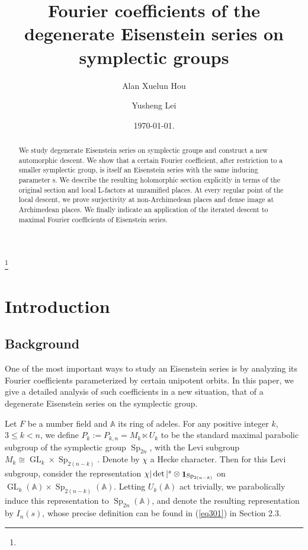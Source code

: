 \documentclass[11pt,notitlepage]{amsart}
\theoremstyle{definition}
\theoremstyle{remark}
\newcommand{\bbA}{\mathbb{A}}
\DeclareMathOperator{\id}{{\bf 1}}
\DeclareMathOperator{\GL}{GL}
\DeclareMathOperator{\Sp}{Sp}
\begin{document}
\title{Fourier coefficients of the degenerate Eisenstein series on symplectic groups}

\author[A.X.Hou]{Alan Xuelun Hou}
\author[Y.Lei]{Yusheng Lei}
\address{Department of Mathematics,
Brandeis University,
Waltham, Massachusetts, USA}
\address{Shanghai, China}
\thanks{}



\date{\today.}


\begin{abstract}
We study degenerate Eisenstein series on symplectic groups and construct a
new automorphic descent. We show that a certain Fourier coefficient, after restriction to a
smaller symplectic group, is itself an Eisenstein series with the same inducing parameter
s. We describe the resulting holomorphic section explicitly in terms of the original section
and local L-factors at unramified places. At every regular point of the local descent, we prove surjectivity at non-Archimedean places and dense
image at Archimedean places.  We finally indicate an application of the iterated descent to maximal Fourier coefficients of Eisenstein
series.
\end{abstract}

\maketitle

\tableofcontents
\section{Introduction}
\subsection{Background} One of the most important ways to study an Eisenstein series is by analyzing its Fourier coefficients parameterized by certain unipotent orbits. In this paper, we give a detailed analysis of such coefficients in a new situation, that of a degenerate Eisenstein series on the symplectic group. 

Let $F$ be a number field and $\bbA$ its ring of adeles. For any positive integer $k$, $3\leqslant k <n$, we define $P_{k}:=P_{k,n} = M_{k}\ltimes U_{k}$ to be the standard maximal parabolic subgroup of the symplectic group $\Sp_{2n}$, with the Levi subgroup $M_k \cong \GL_k\times \Sp_{2(n-k)}$. Denote by $\chi$ a Hecke character. Then for this Levi subgroup, consider the representation $\chi|\det|^s\otimes \id_{\Sp_{2(n-k)}}$ on $\GL_k(\bbA)\times \Sp_{2(n-k)}(\bbA)$. Letting $U_k(\bbA)$ act trivially, we parabolically induce this representation to $\Sp_{2n}(\bbA)$, and denote the resulting representation by $I_n(s)$, whose precise definition can be found in (\ref{eq301}) in Section 2.3. 
\end{document}
